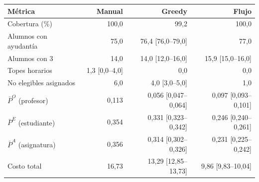 \begin{tabular}{lrrr}
\toprule
\textbf{Métrica} & \textbf{Manual} & \textbf{Greedy} & \textbf{Flujo} \\
\midrule
Cobertura (\%) & 100,0 & 99,2 & 100,0 \\
Alumnos con ayudantía & 75,0 & 76,4 [76,0–79,0] & 77,0 \\
Alumnos con 3 & 14,0 & 14,0 [12,0–16,0] & 15,9 [15,0–16,0] \\
Topes horarios & 1,3 [0,0–4,0] & 0,0 & 0,0 \\
No elegibles asignados & 6,0 & 4,0 [3,0–5,0] & 1,0 \\
$\bar P^O$ (profesor) & 0,113 & 0,056 [0,047–0,064] & 0,097 [0,093–0,101] \\
$\bar P^E$ (estudiante) & 0,354 & 0,331 [0,323–0,342] & 0,246 [0,240–0,261] \\
$\bar P^A$ (asignatura) & 0,356 & 0,314 [0,302–0,326] & 0,231 [0,225–0,242] \\
Costo total & 16,73 & 13,29 [12,85–13,73] & 9,86 [9,83–10,04] \\
\bottomrule
\end{tabular}
